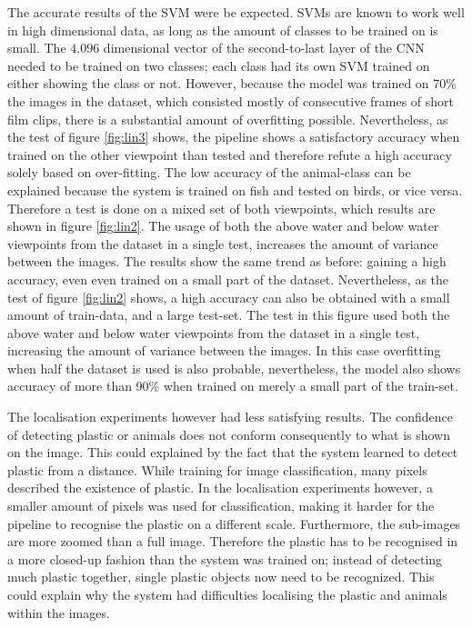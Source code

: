 The accurate results of the SVM were be expected.
SVMs are known to work well in high dimensional data, as long as the amount of classes to be trained on is small.
The $4.096$ dimensional vector of the second-to-last layer of the CNN needed to be trained on two classes; each class had its own SVM trained on either showing the class or not.
However, because the model was trained on 70\% the images in the dataset, which consisted mostly of consecutive frames of short film clips, there is a substantial amount of overfitting possible.
\ifx\showmixi\undefined
Nevertheless, as the test of figure \ref{fig:lin3} shows, the pipeline shows a satisfactory accuracy when trained on the other viewpoint than tested and therefore refute a high accuracy solely based on over-fitting.
The low accuracy of the animal-class can be explained because the system is trained on fish and tested on birds, or vice versa.
Therefore a test is done on a mixed set of both viewpoints, which results are shown in figure \ref{fig:lin2}.
The usage of both the above water and below water viewpoints from the dataset in a single test, increases the amount of variance between the images.
The results show the same trend as before: gaining a high accuracy, even even trained on a small part of the dataset.
\else
Nevertheless, as the test of figure \ref{fig:lin2} shows, a high accuracy can also be obtained with a small amount of train-data, and a large test-set.
The test in this figure used both the above water and below water viewpoints from the dataset in a single test, increasing the amount of variance between the images.
\fi
In this case overfitting when half the dataset is used is also probable, nevertheless, the model also shows accuracy of more than 90\% when trained on merely a small part of the train-set.

The localisation experiments however had less satisfying results.
The confidence of detecting plastic or animals does not conform consequently to what is shown on the image.
This could explained by the fact that the system learned to detect plastic from a distance.
While training for image classification, many pixels described the existence of plastic. In the localisation experiments however, a smaller amount of pixels was used for classification, making it harder for the pipeline to recognise the plastic on a different scale.
Furthermore, the sub-images are more zoomed than a full image.
Therefore the plastic has to be recognised in a more closed-up fashion than the system was trained on; instead of detecting much plastic together, single plastic objects now need to be recognized.
This could explain why the system had difficulties localising the plastic and animals within the images.


